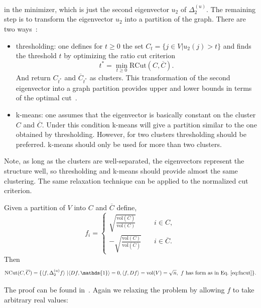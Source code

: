 in the minimizer, which is just the second eigenvector $u_2$ of $\Delta_{2}^{(u)}$. The remaining step is to transform the eigenvector $u_2$ into a partition of the graph. There are two ways~\cite{HeinNotes}:
\begin{itemize}
\item thresholding: one defines for $t\geq 0$ the set $C_t = \{j \in V | u_2(j) > t\}$ and finds the threshold $t$ by optimizing the ratio cut criterion
\begin{equation*}
t^* = \min\limits_{t\geq 0} \mathrm{RCut}(C,\overline{C}).
\end{equation*}   
And return $C_{t^*}$ and $\overline{C}_{t^*}$ as clusters. This transformation of the second eigenvector into a graph partition provides upper and lower bounds in terms of the optimal cut~\cite{Buhler09}. 
\item k-means: one assumes that the eigenvector is basically constant on the cluster $C$ and $\overline{C}$. Under this condition k-means will give a partition similar to the one obtained by thresholding. However, for two clusters
thresholding should be preferred. k-means should only be used for more than two clusters.
\end{itemize}
Note, as long as the clusters are well-separated, the eigenvectors represent the structure well, so thresholding and k-means should provide almost the same clustering.
The same relaxation technique can be applied to the normalized cut criterion.
\begin{lemma}
\label{lem:ncut}
Given a partition of $V$ into $C$ and $\overline{C}$ define,
\begin{equation}
\label{eq:fncut}
 f_i = \begin{cases} 
                      \sqrt{\frac{\mathrm{vol}(\overline{C})}{\mathrm{vol}(C)}}   & \quad i \in C, \\
                      - \sqrt{\frac{\mathrm{vol}(C)}{\mathrm{vol}(\overline{C})}} & \quad i \in \overline{C}.
                     \end{cases}
\end{equation}
Then 
\begin{equation*}
\mathrm{\mathrm{NCut}}(C,\overline{C}) = \{\langle f, \Delta_{2}^{(u)} f \rangle\ |\langle Df, \mathds{1} \rangle=0, \langle f, Df \rangle = \mathrm{vol}(V) =\sqrt{n}, \text{ $f$ has form as in Eq.~\eqref{eq:fncut}} \}.
\end{equation*}
\end{lemma}
The proof can be found in~\cite{Luxb07}. 
Again we relaxing the problem by allowing $f$ to take arbitrary real values:
